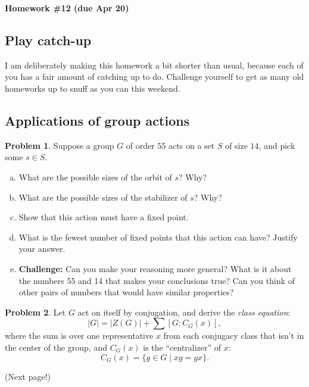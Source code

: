 \documentclass[12pt]{article}
\theoremstyle{definition} %
\newtheorem{problem}{Problem}
\renewcommand{\section}[1]{\begin{center} \textbf{#1} \\\end{center}}
\begin{document}
\section{Homework \#12 (due Apr 20)}

\subsection*{Play catch-up}

I am deliberately making this homework a bit shorter than usual, because each of you has a fair amount of catching up to do. Challenge yourself to get as many old homeworks up to snuff as you can this weekend.

\subsection*{Applications of group actions}

\begin{problem}
  Suppose a group $G$ of order $55$ acts on a set $S$ of size
  $14$, and pick some $s\in S$.
  \begin{enumerate}[(a)]
  \item What are the possible sizes of the orbit of $s$? Why?
  \item What are the possible sizes of the stabilizer of $s$? Why?
  \item Show that this action must have a fixed point.
  \item What is the fewest number of fixed points that this action can have? Justify your answer.
  \item \textbf{Challenge:} Can you make your reasoning more general? What is it about the numbers 55 and 14 that makes your conclusions true? Can you think of other pairs of numbers that would have similar properties?
  \end{enumerate}
\end{problem}

\begin{problem}
  Let $G$ act on itself by conjugation, and derive the \textit{class equation}:
  \[|G| = |Z(G)| + \sum [G:C_G(x)],\]
  where the sum is over one representative $x$ from each conjugacy class that isn't in the center of the group, and $C_G(x)$ is the ``centralizer'' of $x$:
  \[C_G(x) = \{g\in G \mid xg = gx\}.\]
\end{problem}

\vfill

(Next page!)

\vfill
\newpage
\end{document}
